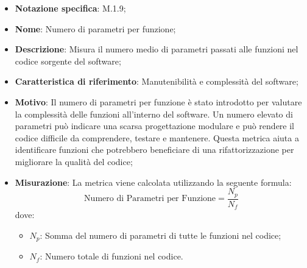\begin{itemize}
    \item \textbf{Notazione specifica}: M.1.9;
    \item \textbf{Nome}: Numero di parametri per funzione;
    \item \textbf{Descrizione}: Misura il numero medio di parametri passati alle funzioni nel codice sorgente del software;
    \item \textbf{Caratteristica di riferimento}: Manutenibilità e complessità del software;
    \item \textbf{Motivo}: Il numero di parametri per funzione è stato introdotto per valutare la complessità delle funzioni all'interno del software. Un numero elevato di parametri può indicare una scarsa progettazione modulare e può rendere il codice difficile da comprendere, testare e mantenere. Questa metrica aiuta a identificare funzioni che potrebbero beneficiare di una rifattorizzazione per migliorare la qualità del codice;
    \item \textbf{Misurazione}: La metrica viene calcolata utilizzando la seguente formula:
    \[
    \text{Numero di Parametri per Funzione} = \frac{N_{p}}{N_{f}}
    \]
    dove:
    \begin{itemize}
        \item $N_{p}$: Somma del numero di parametri di tutte le funzioni nel codice;
        \item $N_{f}$: Numero totale di funzioni nel codice.
    \end{itemize}


\end{itemize}
